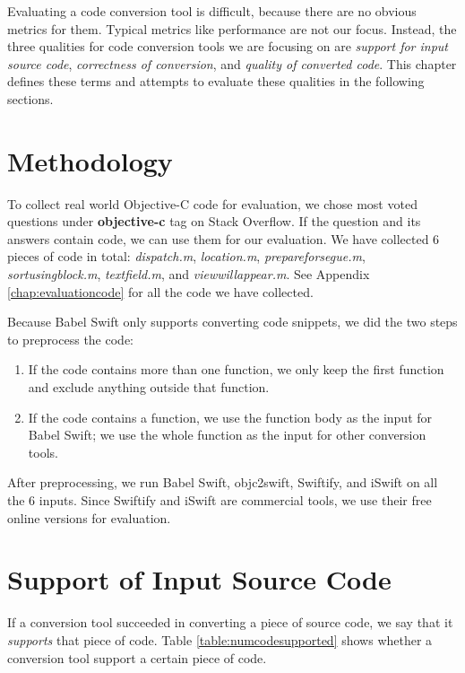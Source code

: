 \documentclass{sfuthesis}
\begin{document}
Evaluating a code conversion tool is difficult, because there are no obvious metrics for them. Typical metrics like performance are not our focus. Instead, the three qualities for code conversion tools we are focusing on are \emph{support for input source code}, \emph{correctness of conversion}, and \emph{quality of converted code}. This chapter defines these terms and attempts to evaluate these qualities in the following sections.

\section{Methodology}

To collect real world Objective-C code for evaluation, we chose most voted questions under \textbf{objective-c} tag on Stack Overflow. If the question and its answers contain code, we can use them for our evaluation. We have collected 6 pieces of code in total: \emph{dispatch.m}, \emph{location.m}, \emph{prepareforsegue.m}, \emph{sortusingblock.m}, \emph{textfield.m}, and \emph{viewwillappear.m}. See Appendix \ref{chap:evaluationcode} for all the code we have collected.

Because Babel Swift only supports converting code snippets, we did the two steps to preprocess the code:

\begin{enumerate}
  \item If the code contains more than one function, we only keep the first function and exclude anything outside that function.
  \item If the code contains a function, we use the function body as the input for Babel Swift; we use the whole function as the input for other conversion tools.
\end{enumerate}

After preprocessing, we run Babel Swift, objc2swift, Swiftify, and iSwift on all the 6 inputs. Since Swiftify and iSwift are commercial tools, we use their free online versions for evaluation.  

\section{Support of Input Source Code}

If a conversion tool succeeded in converting a piece of source code, we say that it \emph{supports} that piece of code. Table \ref{table:numcodesupported} shows whether a conversion tool support a certain piece of code.
\end{document}
